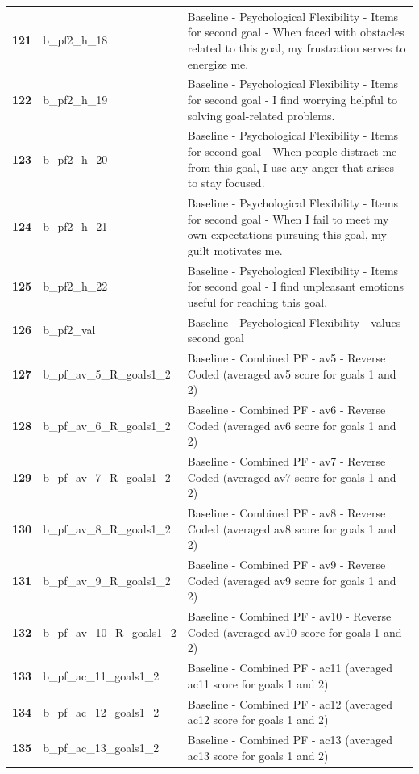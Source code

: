 \documentclass[
  letterpaper,
  DIV=11,
  numbers=noendperiod]{scrartcl}
\begin{document}
\begin{longtable}[t]{>{}cll}
\addlinespace
\textbf{121} & b\_pf2\_h\_18 & Baseline - Psychological Flexibility - Items for second goal - When faced with obstacles related to this goal, my frustration serves to energize me.\\
\textbf{122} & b\_pf2\_h\_19 & Baseline - Psychological Flexibility - Items for second goal - I find worrying helpful to solving goal-related problems.\\
\textbf{123} & b\_pf2\_h\_20 & Baseline - Psychological Flexibility - Items for second goal - When people distract me from this goal, I use any anger that arises to stay focused.\\
\textbf{124} & b\_pf2\_h\_21 & Baseline - Psychological Flexibility - Items for second goal - When I fail to meet my own expectations pursuing this goal, my guilt motivates me.\\
\textbf{125} & b\_pf2\_h\_22 & Baseline - Psychological Flexibility - Items for second goal - I find unpleasant emotions useful for reaching this goal.\\
\addlinespace
\textbf{126} & b\_pf2\_val & Baseline - Psychological Flexibility - values second goal\\
\textbf{127} & b\_pf\_av\_5\_R\_goals1\_2 & Baseline - Combined PF - av5 - Reverse Coded (averaged av5 score for goals 1 and 2)\\
\textbf{128} & b\_pf\_av\_6\_R\_goals1\_2 & Baseline - Combined PF - av6 - Reverse Coded (averaged av6 score for goals 1 and 2)\\
\textbf{129} & b\_pf\_av\_7\_R\_goals1\_2 & Baseline - Combined PF - av7 - Reverse Coded (averaged av7 score for goals 1 and 2)\\
\textbf{130} & b\_pf\_av\_8\_R\_goals1\_2 & Baseline - Combined PF - av8 - Reverse Coded (averaged av8 score for goals 1 and 2)\\
\addlinespace
\textbf{131} & b\_pf\_av\_9\_R\_goals1\_2 & Baseline - Combined PF - av9 - Reverse Coded (averaged av9 score for goals 1 and 2)\\
\textbf{132} & b\_pf\_av\_10\_R\_goals1\_2 & Baseline - Combined PF - av10 - Reverse Coded (averaged av10 score for goals 1 and 2)\\
\textbf{133} & b\_pf\_ac\_11\_goals1\_2 & Baseline - Combined PF - ac11 (averaged ac11 score for goals 1 and 2)\\
\textbf{134} & b\_pf\_ac\_12\_goals1\_2 & Baseline - Combined PF - ac12 (averaged ac12 score for goals 1 and 2)\\
\textbf{135} & b\_pf\_ac\_13\_goals1\_2 & Baseline - Combined PF - ac13 (averaged ac13 score for goals 1 and 2)\\

\end{longtable}
\end{document}
